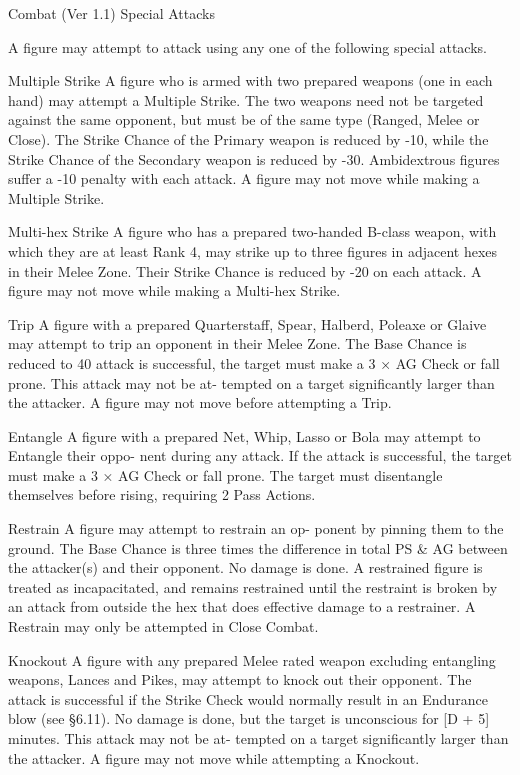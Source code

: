 \begin{Chapter}{Combat (Ver 1.1)}
Special Attacks 

A figure may attempt to attack using any one of the 
following special attacks. 

Multiple  Strike  A  figure  who  is  armed  with  two 
prepared weapons (one in each hand) may attempt 
a  Multiple  Strike.  The  two  weapons  need  not  be 
targeted against the same opponent, but must be of 
the  same  type  (Ranged,  Melee  or  Close).  The 
Strike Chance of the Primary weapon is reduced by 
-10,  while  the  Strike  Chance  of  the  Secondary 
weapon  is  reduced  by  -30.  Ambidextrous  figures 
suffer a -10 penalty with each attack. A figure may 
not move while making a Multiple Strike. 

Multi-hex  Strike  A  figure  who  has  a  prepared 
two-handed B-class weapon, with which they are at 
least  Rank  4,  may  strike  up  to  three  figures  in 
adjacent  hexes  in  their  Melee  Zone.  Their  Strike 
Chance is reduced by -20 on each attack. A figure 
may not move while making a Multi-hex Strike. 

Trip A figure  with a prepared Quarterstaff, Spear, 
Halberd,  Poleaxe  or  Glaive  may  attempt  to trip an 
opponent in their Melee Zone. The Base Chance is 
reduced  to  40%
attack is successful, the target must make a 3 × AG 
Check  or  fall  prone.  This  attack  may  not  be  at-
tempted  on  a  target  significantly  larger  than  the 
attacker. A figure may not move before attempting 
a Trip. 

Entangle  A  figure  with  a  prepared  Net,  Whip, 
Lasso or Bola may attempt to Entangle their oppo-
nent  during  any  attack.  If  the  attack  is  successful, 
the target must make a 3 × AG Check or fall prone. 
The  target  must  disentangle  themselves  before 
rising, requiring 2 Pass Actions. 

Restrain  A  figure  may  attempt  to  restrain  an  op-
ponent  by  pinning  them  to  the  ground.  The  Base 
Chance  is  three  times  the  difference  in total  PS  \& 
AG between the attacker(s) and their opponent. No 
damage  is  done.  A  restrained  figure  is  treated  as 
incapacitated,  and  remains  restrained  until  the 
restraint  is  broken  by  an  attack  from  outside  the 
hex  that  does  effective  damage  to  a  restrainer.  A 
Restrain may only be attempted in Close Combat. 

Knockout A figure with any prepared Melee rated 
weapon excluding entangling weapons, Lances and 
Pikes,  may  attempt  to  knock  out  their  opponent. 
The attack is successful if the Strike Check would 
normally  result  in  an  Endurance  blow  (see  §6.11). 
No  damage  is  done,  but  the  target  is  unconscious 
for  [D  +  5]  minutes.  This  attack  may  not  be  at-
tempted  on  a  target  significantly  larger  than  the 
attacker.  A  figure  may  not  move  while  attempting 
a Knockout. 


\end{Chapter}
